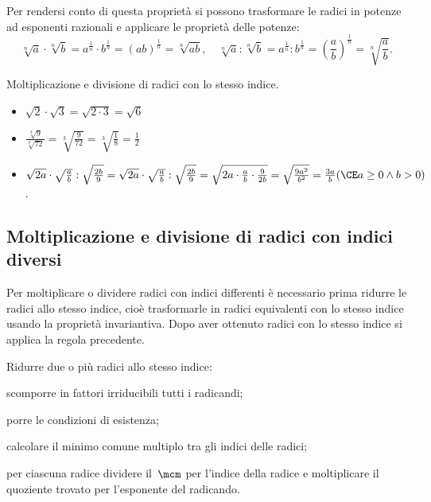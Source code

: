 Per rendersi conto di questa proprietà si possono trasformare le radici in 
potenze ad esponenti razionali e applicare le proprietà delle potenze:
 \[\sqrt[n]a\cdot \sqrt[n]b=a^{\frac 1 n}\cdot b^{\frac 1 n}=(ab)^{\frac 1 n}=
   \sqrt[n]{ab},\quad \sqrt[n]a:\sqrt[n]b=a^{\frac 1 n}:b^{\frac 1 n}=
   \left(\dfrac a b\right)^{\frac 1 n}=\sqrt[n]{\dfrac a b}.\]

\begin{exrig}
 \begin{esempio}
Moltiplicazione e divisione di radici con lo stesso indice.
\begin{itemize}
\item \(\sqrt 2\cdot \sqrt 3=\sqrt{2\cdot 3}=\sqrt 6\)
\item \(\frac{\sqrt[3]9}{\sqrt[3]{72}}=\sqrt[3]{\frac 9{72}}=
       \sqrt[3]{\frac 1 8}=\frac 1 2\)
\item \(\sqrt{2a}\cdot \sqrt{\frac a b}:\sqrt{\frac {2b} 9}=
       \sqrt{2a}\cdot \sqrt{\frac a b}:\sqrt{\frac {2b} 9}=
       \sqrt{2a\cdot \frac a b\cdot \frac 9{2b}}=\sqrt{\frac{9a^2}{b^2}}=
       \frac {3a} b 
      (\CE a\ge 0\wedge b>0)\).
\end{itemize}
 \end{esempio}
\end{exrig}

\subsection{Moltiplicazione e divisione di radici con indici diversi}
Per moltiplicare o dividere radici con indici differenti è necessario prima 
ridurre le radici allo stesso indice, cioè trasformarle in radici equivalenti 
con lo stesso indice usando la proprietà invariantiva. Dopo aver ottenuto 
radici con lo stesso indice si applica la regola precedente.

\begin{procedura}
Ridurre due o più radici allo stesso indice:
\begin{enumeratea}
 \item scomporre in fattori irriducibili tutti i radicandi;
 \item porre le condizioni di esistenza;
 \item calcolare il minimo comune multiplo tra gli indici delle radici;
 \item per ciascuna radice dividere il~\(\mcm\) per l'indice della radice e 
  moltiplicare il quoziente trovato per l'esponente del radicando.
\end{enumeratea}
\end{procedura}

